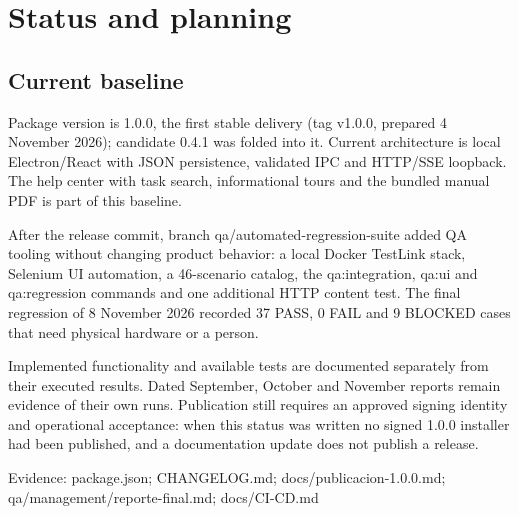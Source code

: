 \section{Status and planning}
\subsection{Current baseline}

Package version is 1.0.0, the first stable delivery (tag v1.0.0, prepared 4 November 2026); candidate 0.4.1 was folded into it. Current architecture is local Electron/React with JSON persistence, validated IPC and HTTP/SSE loopback. The help center with task search, informational tours and the bundled manual PDF is part of this baseline.

After the release commit, branch qa/automated-regression-suite added QA tooling without changing product behavior: a local Docker TestLink stack, Selenium UI automation, a 46-scenario catalog, the qa:integration, qa:ui and qa:regression commands and one additional HTTP content test. The final regression of 8 November 2026 recorded 37 PASS, 0 FAIL and 9 BLOCKED cases that need physical hardware or a person.

Implemented functionality and available tests are documented separately from their executed results. Dated September, October and November reports remain evidence of their own runs. Publication still requires an approved signing identity and operational acceptance: when this status was written no signed 1.0.0 installer had been published, and a documentation update does not publish a release.

Evidence: package.json; CHANGELOG.md; docs/publicacion-1.0.0.md; qa/management/reporte-final.md; docs/CI-CD.md
